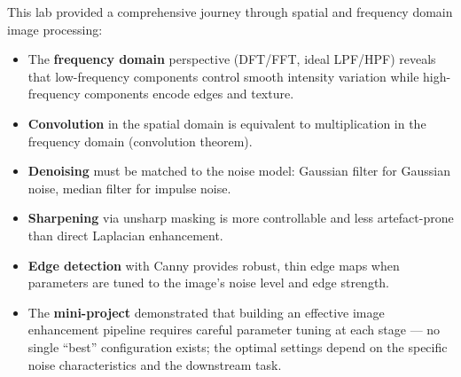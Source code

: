 \documentclass[12pt,a4paper]{article}
\begin{document}
This lab provided a comprehensive journey through spatial and frequency domain image processing:

\begin{itemize}[leftmargin=*]
  \item The \textbf{frequency domain} perspective (DFT/FFT, ideal LPF/HPF) reveals that low-frequency components control smooth intensity variation while high-frequency components encode edges and texture.
  \item \textbf{Convolution} in the spatial domain is equivalent to multiplication in the frequency domain (convolution theorem).
  \item \textbf{Denoising} must be matched to the noise model: Gaussian filter for Gaussian noise, median filter for impulse noise.
  \item \textbf{Sharpening} via unsharp masking is more controllable and less artefact-prone than direct Laplacian enhancement.
  \item \textbf{Edge detection} with Canny provides robust, thin edge maps when parameters are tuned to the image's noise level and edge strength.
  \item The \textbf{mini-project} demonstrated that building an effective image enhancement pipeline requires careful parameter tuning at each stage --- no single ``best'' configuration exists; the optimal settings depend on the specific noise characteristics and the downstream task.
\end{itemize}
\end{document}
